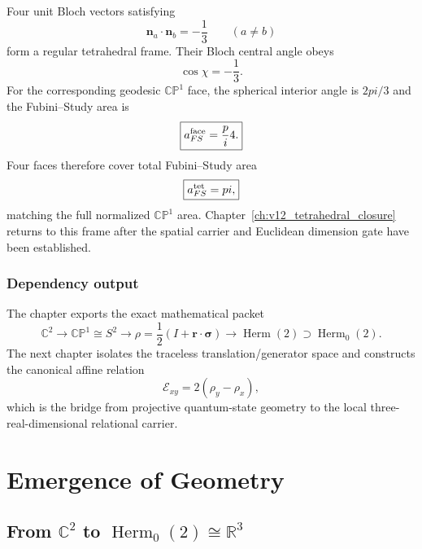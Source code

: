 \documentclass[11pt,a4paper,twoside]{book}
\def\pi{pi}%
\theoremstyle{definition}
\begin{document}
Four unit Bloch vectors satisfying
\begin{equation}
\mathbf n_a\cdot\mathbf n_b=-\frac13
\qquad(a\neq b)
\end{equation}
form a regular tetrahedral frame. Their Bloch central angle obeys
\begin{equation}
\cos\chi=-\frac13.
\end{equation}
For the corresponding geodesic $\mathbb{CP}^1$ face, the spherical interior angle is $2\pi/3$ and the Fubini--Study area is
\begin{equation}
\boxed{a_{FS}^{\rm face}=\frac\pi4.}
\end{equation}
Four faces therefore cover total Fubini--Study area
\begin{equation}
\boxed{a_{FS}^{\rm tet}=\pi,}
\end{equation}
matching the full normalized $\mathbb{CP}^1$ area. Chapter~\ref{ch:v12_tetrahedral_closure} returns to this frame after the spatial carrier and Euclidean dimension gate have been established.

\section{Dependency output}

The chapter exports the exact mathematical packet
\begin{equation}
\boxed{
\mathbb C^2
\to
\mathbb{CP}^1\cong S^2
\to
\rho=\frac12(I+\mathbf r\cdot\boldsymbol\sigma)
\to
\operatorname{Herm}(2)
\supset
\operatorname{Herm}_0(2).
}
\end{equation}
The next chapter isolates the traceless translation/generator space and constructs the canonical affine relation
\[
\mathcal E_{xy}=2(\rho_y-\rho_x),
\]
which is the bridge from projective quantum-state geometry to the local three-real-dimensional relational carrier.

\clearpage




\part{Emergence of Geometry}

\chapter[C2 to Herm0(2) and R3]{From $\mathbb C^2$ to $\operatorname{Herm}_0(2)\cong\mathbb R^3$}
\label{ch:v12_c2_herm0_r3}
\end{document}
